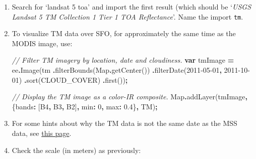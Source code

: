 \documentclass[
]{article}
\newenvironment{Shaded}{\begin{snugshade}}{\end{snugshade}}
\newcommand{\BuiltInTok}[1]{#1}
\newcommand{\CommentTok}[1]{\textcolor[rgb]{0.56,0.35,0.01}{\textit{#1}}}
\newcommand{\DataTypeTok}[1]{\textcolor[rgb]{0.13,0.29,0.53}{#1}}
\newcommand{\DecValTok}[1]{\textcolor[rgb]{0.00,0.00,0.81}{#1}}
\newcommand{\FloatTok}[1]{\textcolor[rgb]{0.00,0.00,0.81}{#1}}
\newcommand{\FunctionTok}[1]{\textcolor[rgb]{0.00,0.00,0.00}{#1}}
\newcommand{\KeywordTok}[1]{\textcolor[rgb]{0.13,0.29,0.53}{\textbf{#1}}}
\newcommand{\NormalTok}[1]{#1}
\newcommand{\OperatorTok}[1]{\textcolor[rgb]{0.81,0.36,0.00}{\textbf{#1}}}
\newcommand{\StringTok}[1]{\textcolor[rgb]{0.31,0.60,0.02}{#1}}
\begin{document}
\begin{enumerate}
\def\labelenumi{\arabic{enumi}.}
\item
  Search for `landsat 5 toa' and import the first result (which should be `\emph{USGS Landsat 5 TM Collection 1 Tier 1 TOA Reflectance}'. Name the import \texttt{tm}.
\item
  To visualize TM data over SFO, for approximately the same time as the MODIS image, use:

\begin{Shaded}
\begin{Highlighting}[]

\CommentTok{// Filter TM imagery by location, date and cloudiness.}
\KeywordTok{var}\NormalTok{ tmImage }\OperatorTok{=}\NormalTok{ ee}\OperatorTok{.}\FunctionTok{Image}\NormalTok{(tm}
            \OperatorTok{.}\FunctionTok{filterBounds}\NormalTok{(}\BuiltInTok{Map}\OperatorTok{.}\FunctionTok{getCenter}\NormalTok{())}
            \OperatorTok{.}\FunctionTok{filterDate}\NormalTok{(}\StringTok{\textquotesingle{}2011{-}05{-}01\textquotesingle{}}\OperatorTok{,} \StringTok{\textquotesingle{}2011{-}10{-}01\textquotesingle{}}\NormalTok{)}
            \OperatorTok{.}\FunctionTok{sort}\NormalTok{(}\StringTok{\textquotesingle{}CLOUD\_COVER\textquotesingle{}}\NormalTok{)}
            \OperatorTok{.}\FunctionTok{first}\NormalTok{())}\OperatorTok{;}

\CommentTok{// Display the TM image as a color{-}IR composite.}
\BuiltInTok{Map}\OperatorTok{.}\FunctionTok{addLayer}\NormalTok{(tmImage}\OperatorTok{,}\NormalTok{ \{}\DataTypeTok{bands}\OperatorTok{:}\NormalTok{ [}\StringTok{\textquotesingle{}B4\textquotesingle{}}\OperatorTok{,} \StringTok{\textquotesingle{}B3\textquotesingle{}}\OperatorTok{,} \StringTok{\textquotesingle{}B2\textquotesingle{}}\NormalTok{]}\OperatorTok{,} \DataTypeTok{min}\OperatorTok{:} \DecValTok{0}\OperatorTok{,} \DataTypeTok{max}\OperatorTok{:} \FloatTok{0.4}\NormalTok{\}}\OperatorTok{,} \StringTok{\textquotesingle{}TM\textquotesingle{}}\NormalTok{)}\OperatorTok{;} 
\end{Highlighting}
\end{Shaded}
\item
  For some hints about why the TM data is not the same date as the MSS data, see \href{https://www.usgs.gov/core-science-systems/nli/landsat/landsat-5?qt-science_support_page_related_con=0\#qt-science_support_page_related_con}{this page}.
\item
  Check the scale (in meters) as previously:


\end{enumerate}
\end{document}
